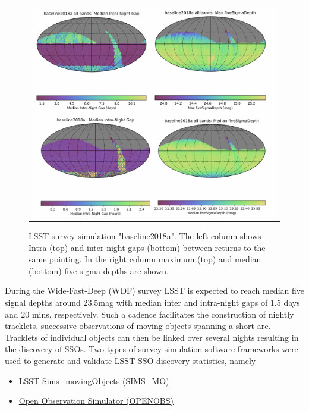 \begin{figure}[tb!]
\begin{tabular}{c}
\includegraphics[width=1\linewidth]{figs/baseline2018a.png}
\end{tabular}
\caption{LSST survey simulation "baseline2018a". The left column shows Intra (top) and inter-night gaps (bottom) between returns to the same pointing. In the right column maximum (top) and median (bottom) five sigma depths are shown.}
\label{fig:gaps}       %
\end{figure}
%
During the \gls{Wide-Fast-Deep} (WDF) survey \gls{LSST} is expected to reach median five signal depths around 23.5mag with median inter and intra-night gaps of 1.5 days and 20 mins, respectively. Such a cadence facilitates the construction of nightly tracklets, successive observations of
moving objects spanning a short arc. Tracklets of individual objects can then be linked over several nights resulting in the discovery of SSOs.
Two types of survey simulation software frameworks were used to generate and validate \gls{LSST} \gls{SSO} discovery statistics, namely
\begin{itemize}
\item \href{https://epyc.astro.washington.edu/~lynnej/sims_movingObjects/lsst.sims.movingObjects.html}{LSST Sims\_movingObjects (SIMS\_MO)}
\item \href{https://github.com/eggls6/openobs}{Open Observation Simulator (OPENOBS)}
\end{itemize}

